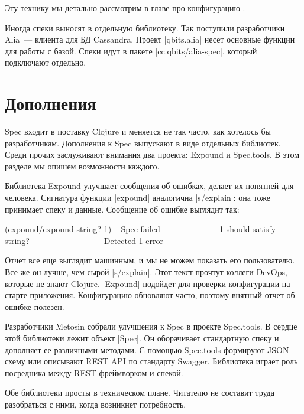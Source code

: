 Эту технику мы детально рассмотрим в главе про
конфигурацию .

Иногда спеки выносят в отдельную библиотеку. Так поступили разработчики
Alia~--- клиента для БД
Cassandra. Проект \spverb|qbits.alia| несет основные функции для работы с
базой. Спеки идут в пакете \spverb|cc.qbits/alia-spec|, который подключают
отдельно.

\section{Дополнения}

Spec входит в поставку Clojure и меняется не так часто, как хотелось бы
разработчикам. Дополнения к Spec выпускают в виде отдельных библиотек. Среди
прочих заслуживают внимания два проекта: Expound и Spec.tools. В этом разделе мы
опишем возможности каждого.

Библиотека Expound улучшает сообщения об
ошибках, делает их понятней для человека. Сигнатура функции \spverb|expound|
аналогична \spverb|s/explain|: она тоже принимает спеку и данные. Сообщение об
ошибке выглядит так:

\begin{english}
  \begin{clojure}
(expound/expound string? 1)
-- Spec failed --------------------
  1
should satisfy
  string?
-------------------------
Detected 1 error
  \end{clojure}
\end{english}

Отчет все еще выглядит машинным, и мы не можем показать его пользователю. Все же
он лучше, чем сырой \spverb|s/explain|. Этот текст прочтут коллеги DevOps,
которые не знают Clojure. \spverb|Expound| подойдет для проверки конфигурации на
старте приложения. Конфигурацию обновляют часто, поэтому внятный отчет об ошибке
полезен.

Разработчики Metosin собрали улучшения к Spec в проекте
Spec.tools. В сердце этой
библиотеки лежит объект \spverb|Spec|. Он оборачивает стандартную спеку и
дополняет ее различными методами. С помощью Spec.tools формируют JSON-схему или
описывают REST API по стандарту Swagger. Библиотека играет роль посредника между
REST-фреймворком и спекой.

Обе библиотеки просты в техническом плане. Читателю не составит труда
разобраться с ними, когда возникнет потребность.


